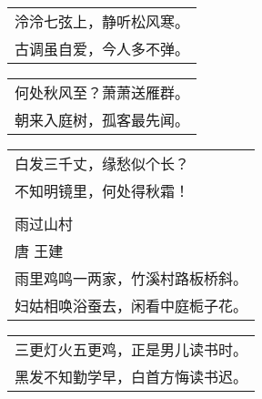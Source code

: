 \noindent\begin{minipage}{\linewidth}
  \vskip-3pt\begin{table}[H]
    \centering
    \begin{tabular}{@{}l@{}}
泠泠七弦上，静听松风寒。\\
古调虽自爱，今人多不弹。
    \end{tabular}
  \end{table}
\end{minipage}
\vspace{1cm}


\noindent\begin{minipage}{\linewidth}
  \vskip-3pt\begin{table}[H]
    \centering
    \begin{tabular}{@{}l@{}}
何处秋风至？萧萧送雁群。\\
朝来入庭树，孤客最先闻。
    \end{tabular}
  \end{table}
\end{minipage}
\vspace{1cm}


\noindent\begin{minipage}{\linewidth}
  \vskip-3pt\begin{table}[H]
    \centering
    \begin{tabular}{@{}l@{}}
白发三千丈，缘愁似个长？\\
不知明镜里，何处得秋霜！\\
\\
雨过山村\\
唐  王建\\
雨里鸡鸣一两家，竹溪村路板桥斜。\\
妇姑相唤浴蚕去，闲看中庭栀子花。
    \end{tabular}
  \end{table}
\end{minipage}
\vspace{1cm}


\noindent\begin{minipage}{\linewidth}
  \vskip-3pt\begin{table}[H]
    \centering
    \begin{tabular}{@{}l@{}}
三更灯火五更鸡，正是男儿读书时。\\
黑发不知勤学早，白首方悔读书迟。
    \end{tabular}
  \end{table}
\end{minipage}
\vspace{1cm}


